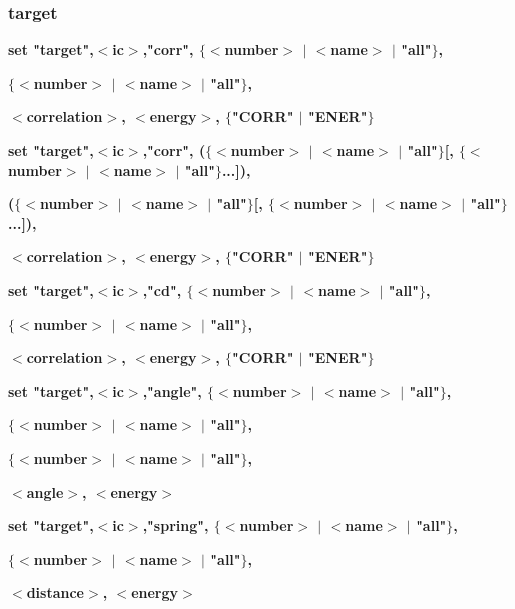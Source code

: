 \subsubsection{target}
{\bf set "target",$ <$ic$> $,"corr",     $ \{$$ <$number$> $ $| $ $ <$name$> $ $| $ "all"$\} $, \par }
{\bf                               $ \{$$ <$number$> $ $| $ $ <$name$> $ $| $ "all"$\} $, \par }
{\bf                               $ <$correlation$> $, $ <$energy$> $, $ \{$"CORR" $| $ "ENER"$\} $ \par }
{\bf set "target",$ <$ic$> $,"corr",    ($ \{$$ <$number$> $ $| $ $ <$name$> $ $| $ "all"$\} $[, $ \{$$ <$number$> $ $| $ $ <$name$> $ $| $ "all"$\} $...]), \par }
{\bf                              ($ \{$$ <$number$> $ $| $ $ <$name$> $ $| $ "all"$\} $[, $ \{$$ <$number$> $ $| $ $ <$name$> $ $| $ "all"$\} $...]), \par }
{\bf                               $ <$correlation$> $, $ <$energy$> $, $ \{$"CORR" $| $ "ENER"$\} $ \par }
{\bf set "target",$ <$ic$> $,"cd",       $ \{$$ <$number$> $ $| $ $ <$name$> $ $| $ "all"$\} $, \par }
{\bf                               $ \{$$ <$number$> $ $| $ $ <$name$> $ $| $ "all"$\} $, \par }
{\bf                               $ <$correlation$> $, $ <$energy$> $, $ \{$"CORR" $| $ "ENER"$\} $ \par }
{\bf  \par }
{\bf set "target",$ <$ic$> $,"angle",    $ \{$$ <$number$> $ $| $ $ <$name$> $ $| $ "all"$\} $, \par }
{\bf                               $ \{$$ <$number$> $ $| $ $ <$name$> $ $| $ "all"$\} $, \par }
{\bf                               $ \{$$ <$number$> $ $| $ $ <$name$> $ $| $ "all"$\} $, \par }
{\bf                               $ <$angle$> $,       $ <$energy$> $ \par }
{\bf  \par }
{\bf set "target",$ <$ic$> $,"spring",   $ \{$$ <$number$> $ $| $ $ <$name$> $ $| $ "all"$\} $, \par }
{\bf                               $ \{$$ <$number$> $ $| $ $ <$name$> $ $| $ "all"$\} $, \par }
{\bf                               $ <$distance$> $,    $ <$energy$> $ \par }
